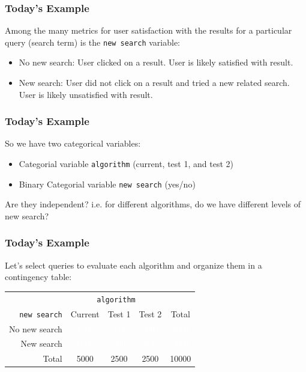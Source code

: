 \documentclass[slides]{beamer}
\newcommand{\blue}[1]{\textcolor{blue2}{#1}}
\newcommand{\white}[1]{\textcolor{white}{#1}}
\begin{document}
\begin{frame}
\frametitle{Today's Example}

Among the many metrics for user satisfaction with the results for a particular \blue{query} (search term) is the \blue{{\tt new search}} variable:
\begin{itemize}
\pause\item No new search: User clicked on a result. User is likely satisfied with result.
\pause\item New search: User \blue{did not} click on a result and tried a new related search.  User is likely unsatisfied with result.
\end{itemize}


\end{frame}


\begin{frame}
\frametitle{Today's Example}
So we have two categorical variables:
\begin{itemize}
\item Categorial variable {\tt algorithm} (current, test 1, and test 2)
\item Binary Categorial variable {\tt new search} (yes/no)
\end{itemize}

\pause Are they independent?  i.e. for different algorithms, do we have different levels of new search?

\end{frame}


\begin{frame}
\frametitle{Today's Example}

Let's select queries to evaluate each algorithm and organize them in a \blue{contingency table}:

\begin{center}
  \begin{tabular}{r|ccc|c}
& \multicolumn{3}{c|}{{\tt algorithm}} & \\
       {\tt new search} & Current & Test 1 & Test 2 & Total \\ 
\hline
    No new search & \white{4000} & \white{2000} & \white{2000} & \white{8000} \\ 
    New search & \white{1000} & \white{500} & \white{500} & \white{2000} \\ 
\hline
    Total & 5000 & 2500 & 2500 & 10000 \\ 
  \end{tabular}
\end{center}


\end{frame}
\end{document}
